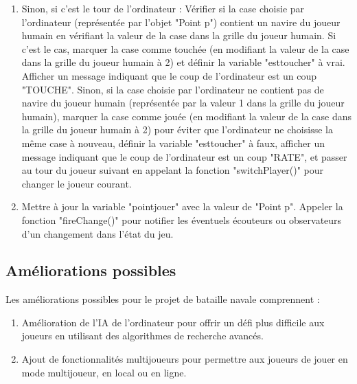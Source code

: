 \documentclass{rapport}
\begin{document}
{\begin{enumerate}
\begin{enumerate}
        \item Sinon, si c'est le tour de l'ordinateur :
        Vérifier si la case choisie par l'ordinateur (représentée par l'objet "Point p") contient un navire du joueur humain en vérifiant la valeur de la case dans la grille du joueur humain. Si c'est le cas, marquer la case comme touchée (en modifiant la valeur de la case dans la grille du joueur humain à 2) et définir la variable "esttoucher" à vrai.
        Afficher un message indiquant que le coup de l'ordinateur est un coup "TOUCHE".
        Sinon, si la case choisie par l'ordinateur ne contient pas de navire du joueur humain (représentée par la valeur 1 dans la grille du joueur humain), marquer la case comme jouée (en modifiant la valeur de la case dans la grille du joueur humain à 2) pour éviter que l'ordinateur ne choisisse la même case à nouveau, définir la variable "esttoucher" à faux, afficher un message indiquant que le coup de l'ordinateur est un coup "RATE", et passer au tour du joueur suivant en appelant la fonction "switchPlayer()" pour changer le joueur courant.
        \item Mettre à jour la variable "pointjouer" avec la valeur de "Point p".
    Appeler la fonction "fireChange()" pour notifier les éventuels écouteurs ou observateurs d'un changement dans l'état du jeu.
\end{enumerate}
    
    
    
\end{enumerate}
           
    \subsection{Améliorations possibles}
            Les améliorations possibles pour le projet de bataille navale comprennent :
\begin{enumerate}
    \item  Amélioration de l'IA de l'ordinateur pour offrir un défi plus difficile aux joueurs en utilisant des algorithmes de recherche avancés.
    \item Ajout de fonctionnalités multijoueurs pour permettre aux joueurs de jouer en mode multijoueur, en local ou en ligne.
   
    
\end{enumerate}

   
}
\end{document}
